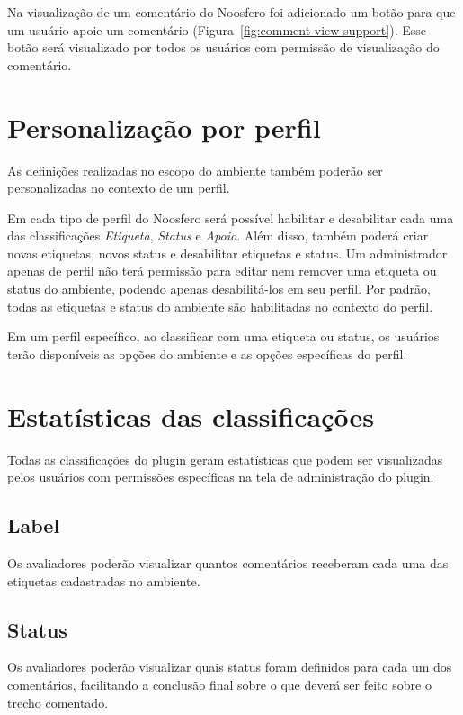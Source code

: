 \documentclass[11pt]{article}
\begin{document}
Na visualização de um comentário do Noosfero foi adicionado um botão para
que um usuário apoie um comentário
(Figura~\ref{fig:comment-view-support}). Esse botão será visualizado por
todos os usuários com permissão de visualização do comentário.

\section{Personalização por perfil}

As definições realizadas no escopo do ambiente também poderão ser
personalizadas no contexto de um perfil.

Em cada tipo de perfil do Noosfero será possível habilitar e desabilitar
cada uma das classificações {\it Etiqueta}, {\it Status} e {\it Apoio}.
Além disso, também poderá criar novas etiquetas, novos status e
desabilitar etiquetas e status. Um administrador
apenas de perfil não terá permissão para editar nem remover uma etiqueta
ou status do ambiente, podendo apenas desabilitá-los em seu perfil. Por
padrão, todas as etiquetas e status do ambiente são habilitadas no
contexto do perfil.

Em um perfil específico, ao classificar com uma etiqueta ou status, os
usuários terão disponíveis as opções do ambiente e as opções específicas do
perfil.

\section{Estatísticas das classificações}

Todas as classificações do plugin geram estatísticas que podem ser
visualizadas pelos usuários com permissões específicas na tela de
administração do plugin.

\subsection{Label}

Os avaliadores poderão visualizar quantos comentários receberam cada uma
das etiquetas cadastradas no ambiente.

\subsection{Status}

Os avaliadores poderão visualizar quais status foram definidos para
cada um dos comentários, facilitando a conclusão final sobre o que
deverá ser feito sobre o trecho comentado.
\end{document}
